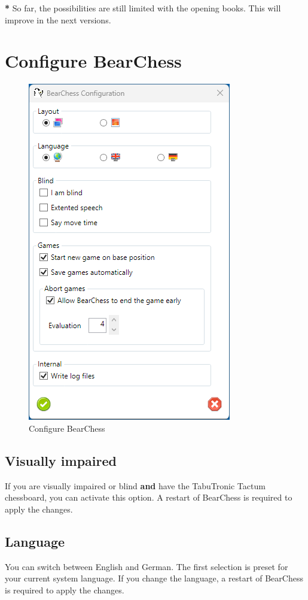 \documentclass[11pt,a4paper]{article}
\begin{document}
	{\color{red}\textbf{*}} So far, the possibilities are still limited with the opening books. This will improve in the next versions. 
	
	\section{Configure BearChess} \label{ConfigureBearChess}
	
	\begin{figure}[H]
		\centering
		\includegraphics[scale=1.0]{ConfigureBearChess.png}
		\caption{Configure BearChess}
		\label{fig:ConfigureBearChess}
	\end{figure}
	
	\subsection{Visually impaired }
	If you are visually impaired or blind \textbf{and} have the TabuTronic Tactum chessboard, you can activate this option. A restart of BearChess is required to apply the changes.
	
	\subsection{Language}
	You can switch between English and German. The first selection is preset for your current system language.
	If you change the language, a restart of BearChess is required to apply the changes.
	
\end{document}
